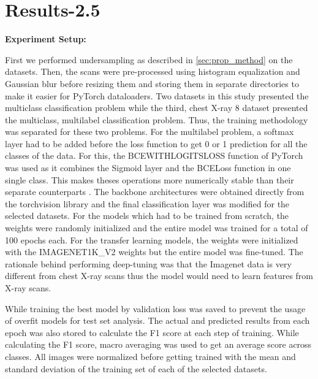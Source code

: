 \documentclass[10pt,twocolumn,letterpaper]{article}
\begin{document}
\section{Results-2.5} 
\label{sec:method}
\textbf{Experiment Setup:}

First we performed undersampling as described in \cref{sec:prop_method} on the datasets. Then,
the scans were pre-processed using histogram equalization and Gaussian blur before resizing them 
and storing them in separate directories to make it easier for PyTorch dataloaders. 
Two datasets in this study presented the multiclass classification problem while the third, 
chest X-ray 8 dataset presented the multiclass, multilabel classification problem. Thus, the 
training methodology was separated for these two problems. For the multilabel problem, 
a softmax layer had to be added before the loss function to get 0 or 1 prediction for 
all the classes of the data. For this, the BCEWITHLOGITSLOSS function of PyTorch was used 
as it combines the Sigmoid layer and the BCELoss function in one single class. This makes 
theses operations more numerically stable than their separate counterparts \cite{bcelogits}.
The backbone architectures were obtained directly from the torchvision library and the final 
classification layer was modified for the selected datasets. For the models which had to be 
trained from scratch, the weights were randomly initialized and the entire model was trained 
for a total of 100 epochs each. For the transfer learning models, the weights were initialized 
with the IMAGENET1K\_V2 weights but the entire model was fine-tuned. The rationale behind 
performing deep-tuning was that the Imagenet data is very different from chest X-ray scans 
thus the model would need to learn features from X-ray scans. 

While training the best model by validation loss was saved to prevent the usage of overfit 
models for test set analysis. The actual and predicted results from each epoch was also stored 
to calculate the F1 score at each step of training. While calculating the F1 score, macro averaging 
was used to get an average score across classes. All images were normalized before getting trained 
with the mean and standard deviation of the training set of each of the selected datasets.
\end{document}

